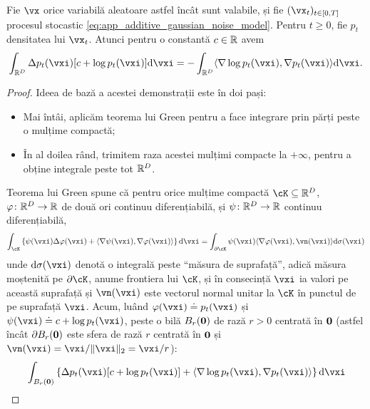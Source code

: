 \documentclass[../../book-main_ro.tex]{subfiles}
\begin{document}
\begin{lemma}\label{lem:diffusion_ibp}
    Fie \(\vx\) orice variabilă aleatoare astfel încât  sunt valabile, și fie \((\vx_{t})_{t \in [0, T]}\) procesul stocastic \eqref{eq:app_additive_gaussian_noise_model}. Pentru \(t \geq 0\), fie \(p_{t}\) densitatea lui \(\vx_{t}\). Atunci pentru o constantă \(c \in \mathbb{R}\) avem 
    \begin{equation}
        \int_{\R^{D}}\Delta p_{t}(\vxi)[c + \log p_{t}(\vxi)]\odif{\vxi} = -\int_{\R^{D}}\ip{\nabla \log p_{t}(\vxi)}{\nabla p_{t}(\vxi)}\odif{\vxi}.
    \end{equation}
\end{lemma}
\begin{proof}
    Ideea de bază a acestei demonstrații este în doi pași:
    \begin{itemize}
        \item Mai întâi, aplicăm teorema lui Green pentru a face integrare prin părți peste o mulțime compactă;
        \item În al doilea rând, trimitem raza acestei mulțimi compacte la \(+\infty\), pentru a obține integrale peste tot \(\mathbb{R}^{D}\).
    \end{itemize}
    Teorema lui Green spune că pentru orice mulțime compactă \(\cK \subseteq \R^{D}\), \(\plainphi \colon \R^{D} \to \R\) de două ori continuu diferențiabilă, și \(\psi \colon \mathbb{R}^{D} \to \mathbb{R}\) continuu diferențiabilă,
    \begin{equation}
        \int_{\cK}\bc{\psi(\vxi) \Delta \plainphi(\vxi) + \ip{\nabla \psi(\vxi)}{\nabla \plainphi(\vxi)}}\odif{\vxi} = \int_{\partial \cK}\psi(\vxi)\ip{\nabla \plainphi(\vxi)}{\vn(\vxi)}\odif{\sigma(\vxi)}
    \end{equation}
    unde \(\odif{\sigma(\vxi)}\) denotă o integrală peste ``măsura de suprafață'', adică măsura moștenită pe \(\partial \cK\), anume frontiera lui \(\cK\), și în consecință \(\vxi\) ia valori pe această suprafață și \(\vn(\vxi)\) este vectorul normal unitar la \(\cK\) în punctul de pe suprafață \(\vxi\). Acum, luând \(\plainphi(\vxi) \doteq p_{t}(\vxi)\) și \(\psi(\vxi) \doteq c + \log p_{t}(\vxi)\), peste o bilă \(B_{r}(\bm{0})\) de rază \(r > 0\) centrată în \(\bm{0}\) (astfel încât \(\partial B_{r}(\bm{0})\) este sfera de rază \(r\) centrată în \(\bm{0}\) și \(\vn(\vxi) = \vxi/\norm{\vxi}_{2} = \vxi/r\)):
    \begin{align}
        &\int_{B_{r}(\vzero)}\bc{\Delta p_{t}(\vxi)[c + \log p_{t}(\vxi)] + \ip{\nabla \log p_{t}(\vxi)}{\nabla p_{t}(\vxi)}}\odif{\vxi} \\

\end{align}
\end{proof}
\end{document}
